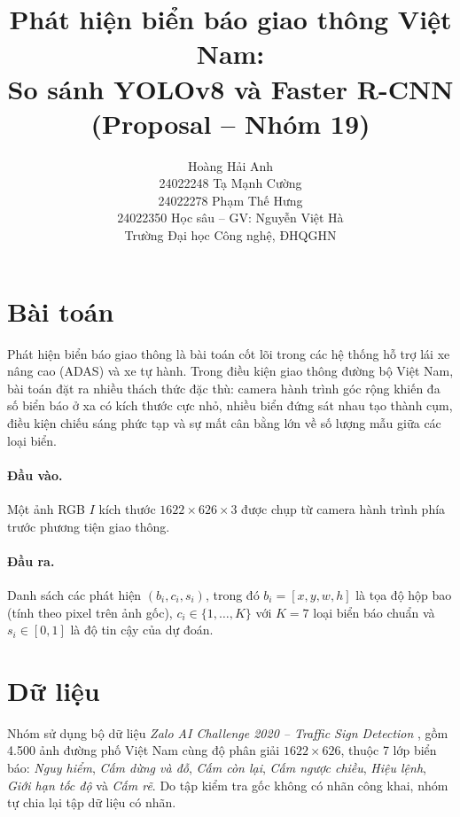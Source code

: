 \documentclass[11pt]{article}
\title{Phát hiện biển báo giao thông Việt Nam:\\
So sánh YOLOv8 và Faster R-CNN\\
(Proposal -- Nhóm 19)}
\author{
Hoàng Hải Anh \\ 24022248
\And
Tạ Mạnh Cường \\ 24022278
\And
Phạm Thế Hưng \\ 24022350
\AND
Học sâu -- GV: Nguyễn Việt Hà \\
Trường Đại học Công nghệ, ĐHQGHN
}
\begin{document}
\maketitle


\section{Bài toán}

Phát hiện biển báo giao thông là bài toán cốt lõi trong các hệ thống hỗ trợ lái xe nâng cao (ADAS) và xe tự hành. Trong điều kiện giao thông đường bộ Việt Nam, bài toán đặt ra nhiều thách thức đặc thù: camera hành trình góc rộng khiến đa số biển báo ở xa có kích thước cực nhỏ, nhiều biển đứng sát nhau tạo thành cụm, điều kiện chiếu sáng phức tạp và sự mất cân bằng lớn về số lượng mẫu giữa các loại biển.

\paragraph{Đầu vào.}
Một ảnh RGB $I$ kích thước $1622 \times 626 \times 3$ được chụp từ camera hành trình phía trước phương tiện giao thông.

\paragraph{Đầu ra.}
Danh sách các phát hiện $(b_i, c_i, s_i)$, trong đó $b_i = [x, y, w, h]$ là tọa độ hộp bao (tính theo pixel trên ảnh gốc), $c_i \in \{1, \dots, K\}$ với $K=7$ loại biển báo chuẩn và $s_i \in [0, 1]$ là độ tin cậy của dự đoán.


\section{Dữ liệu}

Nhóm sử dụng bộ dữ liệu \emph{Zalo AI Challenge 2020 -- Traffic Sign Detection} \citep{zalo2020traffic}, gồm 4.500 ảnh đường phố Việt Nam cùng độ phân giải $1622 \times 626$, thuộc 7 lớp biển báo: \textit{Nguy hiểm}, \textit{Cấm dừng và đỗ}, \textit{Cấm còn lại}, \textit{Cấm ngược chiều}, \textit{Hiệu lệnh}, \textit{Giới hạn tốc độ} và \textit{Cấm rẽ}. Do tập kiểm tra gốc không có nhãn công khai, nhóm tự chia lại tập dữ liệu có nhãn.
\end{document}
